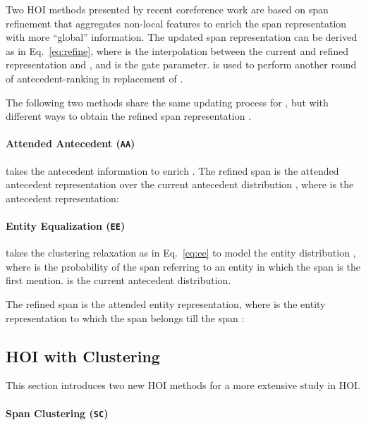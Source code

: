 \documentclass[11pt,a4paper]{article}
\begin{document}
Two HOI methods presented by recent coreference work are based on span refinement that aggregates non-local features to enrich the span representation with more ``global'' information.
The updated span representation  can be derived as in Eq.~\ref{eq:refine}, where  is the interpolation between the current and refined representation  and , and  is the gate parameter. 
 is used to perform another round of antecedent-ranking in replacement of .

The following two methods share the same updating process for , but with different ways to obtain the refined span representation .


\paragraph{Attended Antecedent (\texttt{AA})} 

takes the antecedent information to enrich  \citep{lee-etal-2018-higher,fei-etal-2019-end,joshi-etal-2019-bert,spanbert-joshi}. 
The refined span  is the attended antecedent representation over the current antecedent distribution , where  is the antecedent representation:



\paragraph{Entity Equalization (\texttt{EE})}

takes the clustering relaxation as in Eq.~\ref{eq:ee} to model the entity distribution \citep{kantor-globerson-2019-coreference}, where  is the probability of the span  referring to an entity  in which the span  is the first mention.  is the current antecedent distribution.

The refined span  is the attended entity representation, where  is the entity representation to which the span  belongs till the span :





\subsection{HOI with Clustering}
\label{subsec:new}

This section introduces two new HOI methods for a more extensive study in HOI.



\paragraph{Span Clustering (\texttt{SC})}
\end{document}
